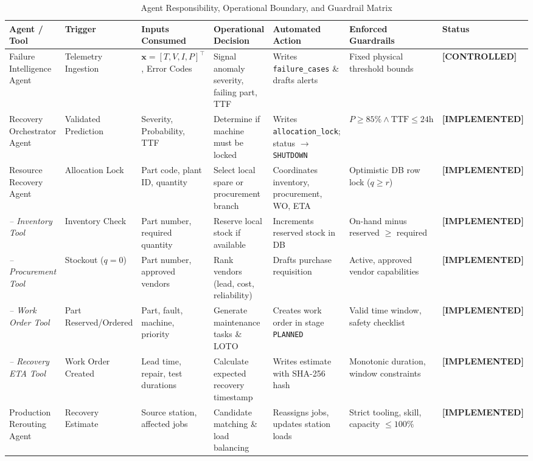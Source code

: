 \documentclass[10pt,twocolumn,a4paper]{article}
\newcommand{\claimtag}[1]{%
    \textsf{\textbf{\scriptsize\color{deepslate}[#1]}}%
}
\begin{document}
\begin{table}[t]
\centering
\scriptsize
\caption{Agent Responsibility, Operational Boundary, and Guardrail Matrix\label{tab:agent_matrix}}
\begin{tabularx}{\textwidth}{>{\raggedright\arraybackslash}p{2.4cm}XXXX>{\raggedright\arraybackslash}X>{\raggedright\arraybackslash}p{1.8cm}}
\toprule
\textbf{Agent / Tool} & \textbf{Trigger} & \textbf{Inputs Consumed} & \textbf{Operational Decision} & \textbf{Automated Action} & \textbf{Enforced Guardrails} & \textbf{Status} \\
\midrule
Failure Intelligence Agent & Telemetry Ingestion & $\mathbf{x}=[T, V, I, P]^\top$, Error Codes & Signal anomaly severity, failing part, TTF & Writes \texttt{failure\_cases} \& drafts alerts & Fixed physical threshold bounds & \claimtag{CONTROLLED} \\
Recovery Orchestrator Agent & Validated Prediction & Severity, Probability, TTF & Determine if machine must be locked & Writes \texttt{allocation\_lock}; status $\to$ \texttt{SHUTDOWN} & $P \ge 85\% \land \text{TTF} \le 24\text{h}$ & \claimtag{IMPLEMENTED} \\
Resource Recovery Agent & Allocation Lock & Part code, plant ID, quantity & Select local spare or procurement branch & Coordinates inventory, procurement, WO, ETA & Optimistic DB row lock ($q \ge r$) & \claimtag{IMPLEMENTED} \\
\quad \textit{-- Inventory Tool} & Inventory Check & Part number, required quantity & Reserve local stock if available & Increments reserved stock in DB & On-hand minus reserved $\ge$ required & \claimtag{IMPLEMENTED} \\
\quad \textit{-- Procurement Tool} & Stockout ($q=0$) & Part number, approved vendors & Rank vendors (lead, cost, reliability) & Drafts purchase requisition & Active, approved vendor capabilities & \claimtag{IMPLEMENTED} \\
\quad \textit{-- Work Order Tool} & Part Reserved/Ordered & Part, fault, machine, priority & Generate maintenance tasks \& LOTO & Creates work order in stage \texttt{PLANNED} & Valid time window, safety checklist & \claimtag{IMPLEMENTED} \\
\quad \textit{-- Recovery ETA Tool} & Work Order Created & Lead time, repair, test durations & Calculate expected recovery timestamp & Writes estimate with SHA-256 hash & Monotonic duration, window constraints & \claimtag{IMPLEMENTED} \\
Production Rerouting Agent & Recovery Estimate & Source station, affected jobs & Candidate matching \& load balancing & Reassigns jobs, updates station loads & Strict tooling, skill, capacity $\le 100\%$ & \claimtag{IMPLEMENTED} \\

\end{tabularx}
\end{table}
\end{document}
